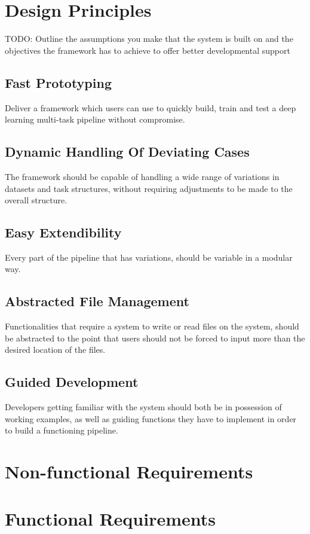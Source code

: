 \section{Design Principles}

TODO: Outline the assumptions you make that the system is built on and the objectives the framework has to achieve to offer better developmental support

\subsection{Fast Prototyping}

Deliver a framework which users can use to quickly build, train and test a deep learning multi-task pipeline without compromise. 

\subsection{Dynamic Handling Of Deviating Cases}

The framework should be capable of handling a wide range of variations in datasets and task structures, without requiring adjustments to be made to the overall structure.

\subsection{Easy Extendibility}

Every part of the pipeline that has variations, should be variable in a modular way.

\subsection{Abstracted File Management}

Functionalities that require a system to write or read files on the system, should be abstracted to the point that users should not be forced to input more than the desired location of the files.

\subsection{Guided Development}

Developers getting familiar with the system should both be in possession of working examples, as well as guiding functions they have to implement in order to build a functioning pipeline.

\section{Non-functional Requirements}

\section{Functional Requirements}